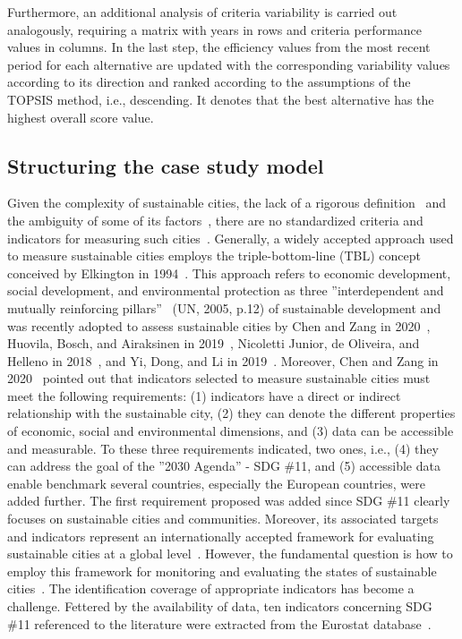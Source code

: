 \documentclass[final,5p,times,twocolumn,authoryear]{elsarticle}
\begin{document}
Furthermore, an additional analysis of criteria variability is carried out analogously, requiring a matrix with years in rows and criteria performance values in columns. In the last step, the efficiency values from the most recent period for each alternative are updated with the corresponding variability values according to its direction and ranked according to the assumptions of the TOPSIS method, i.e., descending. It denotes that the best alternative has the highest overall score value.

\subsection{Structuring the case study model}
\label{sec:structuringEurostat}
%
Given the complexity of sustainable cities, the lack of a rigorous definition~\citep{hassan2015paradox} and the ambiguity of some of its factors~\citep{bouzguenda2019towards, phillis2017urban}, there are no standardized criteria and indicators for measuring such cities~\citep{chen2020evaluation}. Generally, a widely accepted approach used to measure sustainable cities employs the triple-bottom-line (TBL) concept conceived by Elkington in 1994~\citep{sitnikov2013triple}. This approach refers to economic development, social development, and environmental protection as three ''interdependent and mutually reinforcing pillars''~\citep{un2005} (UN, 2005, p.12) of sustainable development and was recently adopted to assess sustainable cities by Chen and Zang in 2020~\citep{chen2020evaluation}, Huovila, Bosch, and Airaksinen in 2019~\citep{huovila2019comparative},  Nicoletti Junior, de Oliveira, and Helleno in 2018~\citep{junior2018sustainability}, and Yi, Dong, and Li in 2019~\citep{yi2019evaluation}. Moreover, Chen and Zang in 2020~\citep{chen2020evaluation} pointed out that indicators selected to measure sustainable cities must meet the following requirements: (1) indicators have a direct or indirect relationship with the sustainable city, (2) they can denote the different properties of economic, social and environmental dimensions, and  (3) data can be accessible and measurable. To these three requirements indicated, two ones, i.e., (4) they can address the goal of the ''2030 Agenda'' - SDG \#11, and (5) accessible data enable benchmark several countries, especially the European countries, were added further. The first requirement proposed was added since SDG \#11 clearly focuses on sustainable cities and communities. 
%
Moreover, its associated targets and indicators represent an internationally accepted framework for evaluating sustainable cities at a global level~\citep{un2016b, un2017}. However, the fundamental question is how to employ this framework for monitoring and evaluating the states of sustainable cities~\citep{huovila2019comparative}. The identification coverage of appropriate indicators has become a challenge. Fettered by the availability of data, ten indicators concerning SDG \#11 referenced to the literature were extracted from the Eurostat database~\citep{eurostat2021}. 
\end{document}
